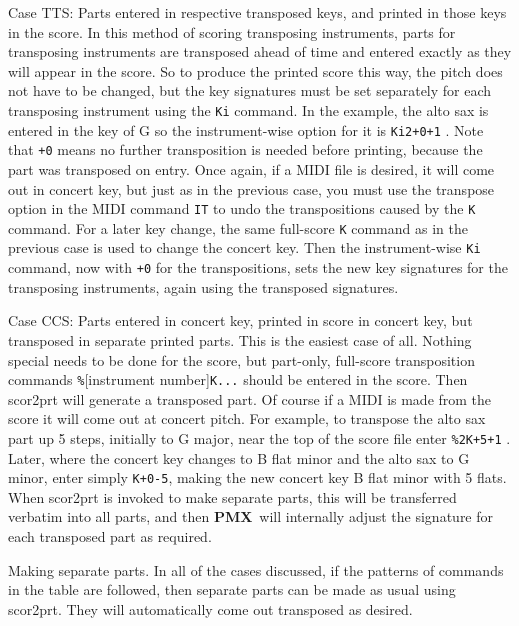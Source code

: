 \documentclass[11pt]{article}
\newcommand\PMXX{\textbf{PMX}}
\newcommand\PMX{\PMXX~}
\begin{document}
{\bfx Case TTS: Parts entered in respective transposed keys, and printed in those keys in the score.}
In this method of scoring transposing instruments, parts for transposing instruments 
are transposed ahead of time and 
entered exactly as they will appear in the score. So to produce the printed
score this way, the pitch does not have to be changed, but the key signatures must be set
separately for each transposing instrument using the {\tt Ki} command. In the example, the alto sax is
entered in the key of G so the instrument-wise option for it is {\tt Ki2+0+1} . Note that {\tt +0} means no
further transposition is needed before printing, because the part was transposed on entry. Once
again, if a MIDI file is desired, it will come out in concert key, but just as in the previous case,
you must use the transpose option in the MIDI command {\tt IT} to undo the transpositions caused
by the {\tt K} command. For a later key change, the same full-score {\tt K} command as in the previous
case is used to change the concert key. Then the instrument-wise {\tt Ki} command, now with {\tt +0} for
the transpositions, sets the new key signatures for the transposing instruments, again using the
transposed signatures.

{\bfx Case CCS: Parts entered in concert key, printed in score in concert key, but transposed in
separate printed parts.}
This is the easiest case of all. Nothing special needs to be done for the score, but part-only,
full-score transposition commands {\tt\%}[instrument number]{\tt K...} should be entered in the score. Then
{\bfx scor2prt} will generate a transposed part. Of course if a MIDI is made from the score it will
come out at concert pitch. For example, to transpose the alto sax part up 5 steps, initially to G
major, near the top of the score file enter {\tt\%2K+5+1} . Later, where the concert key changes to B
flat minor and the alto sax to G minor, enter simply {\tt K+0-5}, making the new concert key B flat
minor with 5 flats. When {\bfx scor2prt} is invoked to make separate parts, this will be transferred
verbatim into all parts, and then \PMX will internally adjust the signature for each transposed part
as required.

{\bfx Making separate parts.}
In all of the cases discussed, if the patterns of commands in the table are followed, then 
separate parts can be made as usual using {\bfx scor2prt}. They will
automatically come out transposed as desired.
\end{document}

